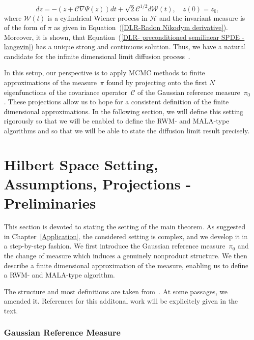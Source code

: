 \begin{equation}
\label{DLR-limit diffusion candidate}
 dz = - ( z + \mathcal{C} \nabla \Psi (z) ) dt + \sqrt{2} \mathcal{C}^{1/2} d \mathcal{W}(t), \quad z(0) = z_0,
\end{equation}
where $ \mathcal{W}(t) $ is a cylindrical Wiener process in $\mathcal{H}$ and the invariant measure is of the form of $\pi$ as given in Equation~(\ref{DLR-Radon Nikodym derivative}). Moreover, it is shown, that Equation~(\ref{DLR- preconditioned semilinear SPDE - langevin}) has a unique strong and continuous solution. Thus, we have a natural candidate for the infinite dimensional limit diffusion process~\autocite[Theorem 3.6]{Hairer2007}.
\newline

In this setup, our perspective is to apply MCMC methods to finite approximations of the measure~$\pi$ found by projecting onto the first $N$ eigenfunctions of the covariance operator~$\mathcal{C}$ of the Gaussian reference measure~$\pi_0$. These projections allow us to hope for a consistent definition of the finite dimensional approximations. In the following section, we will define this setting rigorously so that we will be enabled to define the RWM- and MALA-type algorithms and so that we will be able to state the diffusion limit result precisely.


\section{Hilbert Space Setting, Assumptions, Projections - Preliminaries}
\label{sec:DLR-Preliminaries}

This section is devoted to stating the setting of the main theorem. As suggested in Chapter~\ref{Application}, the considered setting is complex, and we develop it in a step-by-step fashion. We first introduce the Gaussian reference measure~$\pi_0$ and the change of measure which induces a genuinely nonproduct structure. We then describe a finite dimensional approximation of the measure, enabling us to define a RWM- and MALA-type algorithm.

The structure and most definitions are taken from~\autocite[Section 2]{Pillai2012}. At some passages, we amended it. References for this additonal work will be explicitely given in the text.

\subsubsection{Gaussian Reference Measure}

